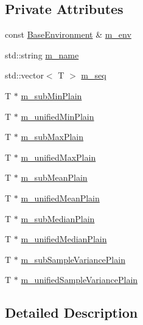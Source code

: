 \subsection*{Private Attributes}
\begin{DoxyCompactItemize}
\item 
const \hyperlink{class_q_u_e_s_o_1_1_base_environment}{Base\-Environment} \& \hyperlink{class_q_u_e_s_o_1_1_scalar_sequence_a71618cd6351b29361b437af68447a4c8}{m\-\_\-env}
\item 
std\-::string \hyperlink{class_q_u_e_s_o_1_1_scalar_sequence_a8568f3ceb7cef2c4e3cf6dbf52d43cdf}{m\-\_\-name}
\item 
std\-::vector$<$ T $>$ \hyperlink{class_q_u_e_s_o_1_1_scalar_sequence_ae616036fd2e62fb69df167814545e893}{m\-\_\-seq}
\item 
T $\ast$ \hyperlink{class_q_u_e_s_o_1_1_scalar_sequence_a3e85805e8fe276feccc90faf652e6b18}{m\-\_\-sub\-Min\-Plain}
\item 
T $\ast$ \hyperlink{class_q_u_e_s_o_1_1_scalar_sequence_af43ad51e7996567d34078c7a39e1ca7f}{m\-\_\-unified\-Min\-Plain}
\item 
T $\ast$ \hyperlink{class_q_u_e_s_o_1_1_scalar_sequence_ad2b2f7ab227f0be4e9b9a12cb0b76676}{m\-\_\-sub\-Max\-Plain}
\item 
T $\ast$ \hyperlink{class_q_u_e_s_o_1_1_scalar_sequence_a47ae40e7381ca7407e447052bd2c2469}{m\-\_\-unified\-Max\-Plain}
\item 
T $\ast$ \hyperlink{class_q_u_e_s_o_1_1_scalar_sequence_a2e4e2bb4fb0a4ea3d10498601345d4fb}{m\-\_\-sub\-Mean\-Plain}
\item 
T $\ast$ \hyperlink{class_q_u_e_s_o_1_1_scalar_sequence_a8a3c141c138c215c8b3672b2efb32108}{m\-\_\-unified\-Mean\-Plain}
\item 
T $\ast$ \hyperlink{class_q_u_e_s_o_1_1_scalar_sequence_a7f9efb259fff49756428a925a80fadad}{m\-\_\-sub\-Median\-Plain}
\item 
T $\ast$ \hyperlink{class_q_u_e_s_o_1_1_scalar_sequence_a68f724b0ff9d94f17e8ce37467a0b4f2}{m\-\_\-unified\-Median\-Plain}
\item 
T $\ast$ \hyperlink{class_q_u_e_s_o_1_1_scalar_sequence_a50930b9c1b76c7860c2613676d2b58c3}{m\-\_\-sub\-Sample\-Variance\-Plain}
\item 
T $\ast$ \hyperlink{class_q_u_e_s_o_1_1_scalar_sequence_acf018e219da854046c5127a39ddf8442}{m\-\_\-unified\-Sample\-Variance\-Plain}
\end{DoxyCompactItemize}


\subsection{Detailed Description}
